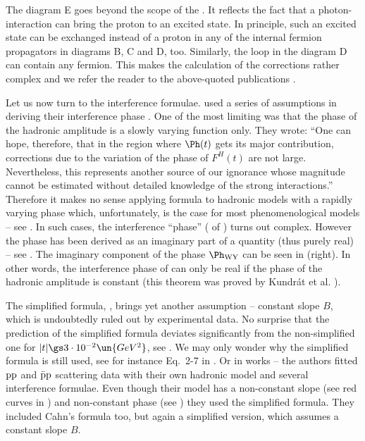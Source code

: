 The diagram E goes beyond the scope of the . It reflects the fact that a photon-interaction can bring the proton to an excited state. In principle, such an excited state can be exchanged instead of a proton in any of the internal fermion propagators in diagrams B, C and D, too. Similarly, the loop in the diagram D can contain any fermion. This makes the calculation of the  corrections rather complex and we refer the reader to the above-quoted publications .


Let us now turn to the interference formulae. \WaY{} used a series of assumptions in deriving their interference phase . One of the most limiting was that the phase of the hadronic amplitude is a slowly varying function only. They wrote: ``One can hope, therefore, that in the region where $\Ph(t)$ gets its major contribution, corrections due to the variation of the phase of $F^H(t)$ are not large. Nevertheless, this represents another source of our ignorance whose magnitude cannot be estimated without detailed knowledge of the strong interactions.'' Therefore it makes no sense applying \WaY{} formula to hadronic models with a rapidly varying phase which, unfortunately, is the case for most phenomenological models -- see . In such cases, the interference ``phase'' (\rhs{} of ) turns out complex. However the phase has been derived as an imaginary part of a quantity (thus purely real) -- see . The imaginary component of the phase $\Ph_{\rm WY}$ can be seen in  (right). In other words, the interference phase of \WaY{} can only be real if the phase of the hadronic amplitude is constant (this theorem was proved by Kundr\' at et al. ).

The simplified \WaY{} formula, , brings yet another assumption -- constant slope $B$, which is undoubtedly ruled out by experimental data. No surprise that the prediction of the simplified formula deviates significantly from the non-simplified one for $|t| \gs 3\cdot 10^{-2}\un{GeV^2}$, see . We may only wonder why the simplified formula is still used, see for instance Eq.~2-7 in    .
Or in works  -- the authors fitted $\rm pp$ and $\rm\bar pp$ scattering data with their own hadronic model and several interference formulae. Even though their model has a non-constant slope (see red curves in ) and non-constant phase (see ) they used the simplified \WY{} formula. They included Cahn's formula too, but again a simplified version, which assumes a constant slope $B$.

